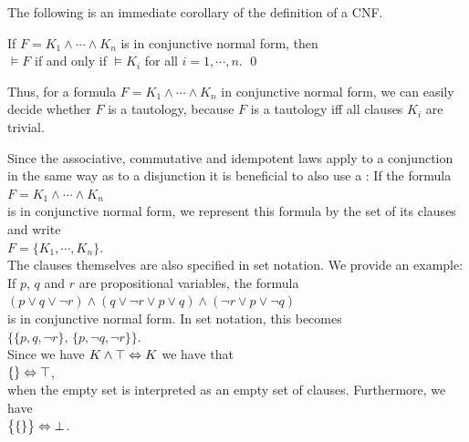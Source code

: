 \noindent
The following is an immediate corollary of the definition of a CNF.
\begin{Corollary} \label{corollary:knf}
  If $F = K_1 \wedge \cdots \wedge K_n$ is in conjunctive normal form, then\\[0.2cm]
  \hspace*{1.3cm} $\models F$ \quad if and only if \quad $\models K_i$ \quad for all $i=1,\cdots,n$. \qed
\end{Corollary}

Thus, for a formula $F = K_1 \wedge \cdots \wedge K_n$ in conjunctive normal form, we can easily decide whether
$F$ is a tautology, because $F$ is a tautology iff all clauses $K_i$ are trivial.
\vspace*{0.2cm}

Since the associative, commutative and idempotent laws apply to a conjunction in the same way as to a
disjunction it is beneficial to also use a
:  If the formula
\\[0.2cm]
\hspace*{1.3cm}
$F = K_1 \wedge \cdots \wedge K_n$
\\[0.2cm]
is in conjunctive normal form, we represent this formula
by the set of its clauses and write \\[0.2cm]
\hspace*{1.3cm} 
$F = \{ K_1, \cdots, K_n \}$. 
\\[0.2cm]
The clauses themselves are also specified in set notation.
We provide an example: If $p$, $q$ and $r$ are propositional variables, the formula 
\\[0.2cm]
\hspace*{1.3cm}
$(p \vee q \vee \neg r) \wedge (q \vee \neg r \vee p \vee q)\wedge (\neg r \vee p \vee \neg q)$
\\[0.2cm]
is in conjunctive normal form.  In set notation, this becomes
\\[0.2cm]
\hspace*{1.3cm}
$\bigl\{ \{p, q, \neg r \},\, \{ p, \neg q, \neg r \} \bigr\}$.
\\[0.2cm]
Since we have $K \wedge \top \Leftrightarrow K$ we have that
\\[0.2cm]
\hspace*{1.3cm}
$\{\} \Leftrightarrow \top$,
\\[0.2cm]
when the empty set is interpreted as an empty set of clauses.  Furthermore, we have
\\[0.2cm]
\hspace*{1.3cm}
$\bigl\{ \{\} \bigr\} \Leftrightarrow \bot$.

